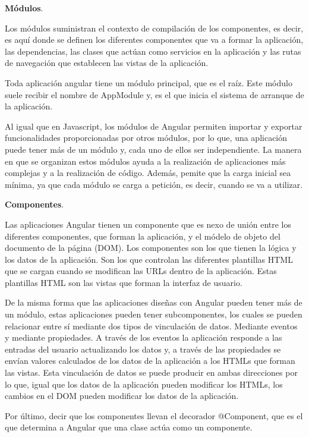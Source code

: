 \documentclass[a4paper, 12pt]{book}
\begin{document}
\textbf{Módulos}.

Los módulos suministran el contexto de compilación de los componentes, es decir, es aquí donde se definen los diferentes componentes que va a formar la aplicación, las dependencias, las clases que actúan como servicios en la aplicación y las rutas de navegación que establecen las vistas de la aplicación. 

Toda aplicación angular tiene un módulo principal, que es el raíz. Este módulo suele recibir el nombre de AppModule y, es el que inicia el sistema de arranque de la aplicación. 

Al igual que en Javascript, los módulos de Angular permiten importar y exportar funcionalidades proporcionadas por otros módulos, por lo que, una aplicación puede tener más de un módulo y, cada uno de ellos ser independiente. La manera en que se organizan estos módulos ayuda a la realización de aplicaciones más complejas y a la realización de código. Además, pemite que la carga inicial sea mínima, ya que cada módulo se carga a petición, es decir, cuando se va a utilizar. 

\textbf{Componentes}. 

Las aplicaciones Angular tienen un componente que es nexo de unión entre los diferentes componentes, que forman la aplicación, y el módelo de objeto del documento de la página (DOM). Los componentes son los que tienen la lógica y los datos de la aplicación. Son los que controlan las diferentes plantillas HTML que se cargan cuando se modifican las URLs dentro de la aplicación. Estas plantillas HTML son las vistas que forman la interfaz de usuario.

De la misma forma que las aplicaciones diseñas con Angular pueden tener más de un módulo, estas aplicaciones pueden tener subcomponentes, los cuales se pueden relacionar entre sí mediante dos tipos de vinculación de datos. Mediante eventos y mediante propiedades. A través de los eventos la aplicación responde a las entradas del usuario actualizando los datos y, a través de las propiedades se envían valores calculados de los datos de la aplicación a los HTMLs que forman las vistas. Esta vinculación de datos se puede producir en ambas direcciones por lo que, igual que los datos de la aplicación pueden modificar los HTMLs, los cambios en el DOM pueden modificar los datos de la aplicación. 

Por último, decir que los componentes llevan el decorador @Component, que es el que determina a Angular que una clase actúa como un componente. 
\end{document}
